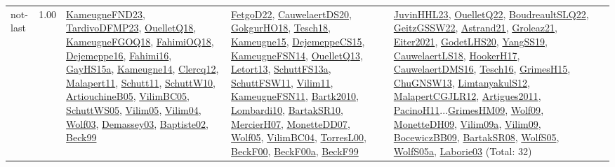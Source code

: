 {\begin{longtable}{p{3cm}r>{\raggedright\arraybackslash}p{6cm}>{\raggedright\arraybackslash}p{6cm}>{\raggedright\arraybackslash}p{8cm}}
\index{not-last}\index{Algorithms!not-last}not-last &  1.00 & \hyperref[detail:KameugneFND23]{KameugneFND23}, \hyperref[detail:TardivoDFMP23]{TardivoDFMP23}, \hyperref[detail:OuelletQ18]{OuelletQ18}, \hyperref[detail:KameugneFGOQ18]{KameugneFGOQ18}, \hyperref[detail:FahimiOQ18]{FahimiOQ18}, \hyperref[detail:Dejemeppe16]{Dejemeppe16}, \hyperref[detail:Fahimi16]{Fahimi16}, \hyperref[detail:GayHS15a]{GayHS15a}, \hyperref[detail:Kameugne14]{Kameugne14}, \hyperref[detail:Clercq12]{Clercq12}, \hyperref[detail:Malapert11]{Malapert11}, \hyperref[detail:Schutt11]{Schutt11}, \hyperref[detail:SchuttW10]{SchuttW10}, \hyperref[detail:ArtiouchineB05]{ArtiouchineB05}, \hyperref[detail:VilimBC05]{VilimBC05}, \hyperref[detail:SchuttWS05]{SchuttWS05}, \hyperref[detail:Vilim05]{Vilim05}, \hyperref[detail:Vilim04]{Vilim04}, \hyperref[detail:Wolf03]{Wolf03}, \hyperref[detail:Demassey03]{Demassey03}, \hyperref[detail:Baptiste02]{Baptiste02}, \hyperref[detail:Beck99]{Beck99} & \hyperref[detail:FetgoD22]{FetgoD22}, \hyperref[detail:CauwelaertDS20]{CauwelaertDS20}, \hyperref[detail:GokgurHO18]{GokgurHO18}, \hyperref[detail:Tesch18]{Tesch18}, \hyperref[detail:Kameugne15]{Kameugne15}, \hyperref[detail:DejemeppeCS15]{DejemeppeCS15}, \hyperref[detail:KameugneFSN14]{KameugneFSN14}, \hyperref[detail:OuelletQ13]{OuelletQ13}, \hyperref[detail:Letort13]{Letort13}, \hyperref[detail:SchuttFS13a]{SchuttFS13a}, \hyperref[detail:SchuttFSW11]{SchuttFSW11}, \hyperref[detail:Vilim11]{Vilim11}, \hyperref[detail:KameugneFSN11]{KameugneFSN11}, \hyperref[detail:Bartk2010]{Bartk2010}, \hyperref[detail:Lombardi10]{Lombardi10}, \hyperref[detail:BartakSR10]{BartakSR10}, \hyperref[detail:MercierH07]{MercierH07}, \hyperref[detail:MonetteDD07]{MonetteDD07}, \hyperref[detail:Wolf05]{Wolf05}, \hyperref[detail:VilimBC04]{VilimBC04}, \hyperref[detail:TorresL00]{TorresL00}, \hyperref[detail:BeckF00]{BeckF00}, \hyperref[detail:BeckF00a]{BeckF00a}, \hyperref[detail:BeckF99]{BeckF99} & \hyperref[detail:JuvinHHL23]{JuvinHHL23}, \hyperref[detail:OuelletQ22]{OuelletQ22}, \hyperref[detail:BoudreaultSLQ22]{BoudreaultSLQ22}, \hyperref[detail:GeitzGSSW22]{GeitzGSSW22}, \hyperref[detail:Astrand21]{Astrand21}, \hyperref[detail:Groleaz21]{Groleaz21}, \hyperref[detail:Eiter2021]{Eiter2021}, \hyperref[detail:GodetLHS20]{GodetLHS20}, \hyperref[detail:YangSS19]{YangSS19}, \hyperref[detail:CauwelaertLS18]{CauwelaertLS18}, \hyperref[detail:HookerH17]{HookerH17}, \hyperref[detail:CauwelaertDMS16]{CauwelaertDMS16}, \hyperref[detail:Tesch16]{Tesch16}, \hyperref[detail:GrimesH15]{GrimesH15}, \hyperref[detail:ChuGNSW13]{ChuGNSW13}, \hyperref[detail:LimtanyakulS12]{LimtanyakulS12}, \hyperref[detail:MalapertCGJLR12]{MalapertCGJLR12}, \hyperref[detail:Artigues2011]{Artigues2011}, \hyperref[detail:PacinoH11]{PacinoH11}...\hyperref[detail:GrimesHM09]{GrimesHM09}, \hyperref[detail:Wolf09]{Wolf09}, \hyperref[detail:MonetteDH09]{MonetteDH09}, \hyperref[detail:Vilim09a]{Vilim09a}, \hyperref[detail:Vilim09]{Vilim09}, \hyperref[detail:BocewiczBB09]{BocewiczBB09}, \hyperref[detail:BartakSR08]{BartakSR08}, \hyperref[detail:WolfS05]{WolfS05}, \hyperref[detail:WolfS05a]{WolfS05a}, \hyperref[detail:Laborie03]{Laborie03} (Total: 32)\\

\end{longtable}}
